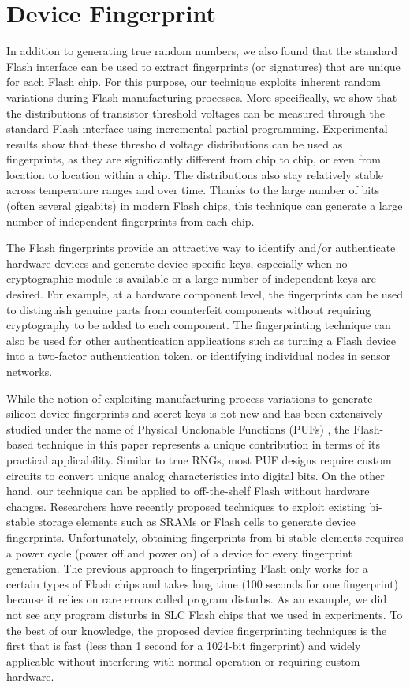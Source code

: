 \section{Device Fingerprint}

In addition to generating true random numbers, we also found that the standard Flash interface can be used to extract fingerprints (or signatures) that are unique for each Flash chip. For this purpose, our technique exploits inherent random variations during Flash manufacturing processes. More specifically, we show that the distributions of transistor threshold voltages can be measured through the standard Flash interface using incremental partial programming. Experimental results show that these threshold voltage distributions can be used as fingerprints, as they are significantly different from chip to chip, or even from location to location within a chip. The distributions also stay relatively stable across temperature ranges and over time. Thanks to the large number of bits (often several gigabits) in modern Flash chips, this technique can generate a large number of independent fingerprints from each chip. 

The Flash fingerprints provide an attractive way to identify and/or authenticate hardware devices and generate device-specific keys, especially when no cryptographic module is available or a large number of independent keys are desired. For example, at a hardware component level, the fingerprints can be used to distinguish genuine parts from counterfeit components without requiring cryptography to be added to each component. The fingerprinting technique can also be used for other authentication applications such as turning a Flash device into a two-factor authentication token, or identifying individual nodes in sensor networks. 

While the notion of exploiting manufacturing process variations to generate silicon device fingerprints and secret keys is not new and has been extensively studied under the name of Physical Unclonable Functions (PUFs) \cite{suhpuf2007}, the Flash-based technique in this paper represents a unique contribution in terms of its practical applicability. Similar to true RNGs, most PUF designs require custom circuits to convert unique analog characteristics into digital bits. On the other hand, our technique can be applied to off-the-shelf Flash without hardware changes. Researchers have recently proposed techniques to exploit existing bi-stable storage elements such as SRAMs \cite{koeberl2011practical} or Flash cells \cite{trust2011} to generate device fingerprints. Unfortunately, obtaining fingerprints from bi-stable elements requires a power cycle (power off and power on) of a device for every fingerprint generation. The previous approach to fingerprinting Flash only works for a certain types of Flash chips and takes long time (100 seconds for one fingerprint) because it relies on rare errors called program disturbs. As an example, we did not see any program disturbs in SLC Flash chips that we used in experiments. To the best of our knowledge, the proposed device fingerprinting techniques is the first that is fast (less than 1 second for a 1024-bit fingerprint) and widely applicable without interfering with normal operation or requiring custom hardware.

